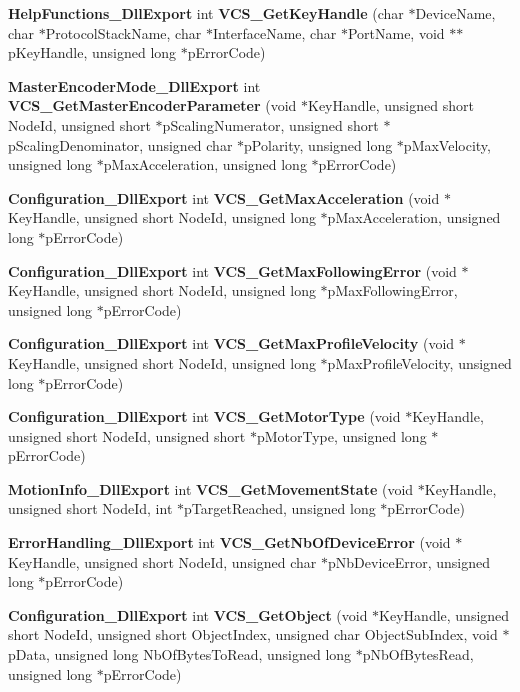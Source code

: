 \begin{DoxyCompactItemize}
\item 
{\bf \-Help\-Functions\-\_\-\-Dll\-Export} int {\bf \-V\-C\-S\-\_\-\-Get\-Key\-Handle} (char $\ast$\-Device\-Name, char $\ast$\-Protocol\-Stack\-Name, char $\ast$\-Interface\-Name, char $\ast$\-Port\-Name, void $\ast$$\ast$p\-Key\-Handle, unsigned long $\ast$p\-Error\-Code)
\item 
{\bf \-Master\-Encoder\-Mode\-\_\-\-Dll\-Export} int {\bf \-V\-C\-S\-\_\-\-Get\-Master\-Encoder\-Parameter} (void $\ast$\-Key\-Handle, unsigned short \-Node\-Id, unsigned short $\ast$p\-Scaling\-Numerator, unsigned short $\ast$p\-Scaling\-Denominator, unsigned char $\ast$p\-Polarity, unsigned long $\ast$p\-Max\-Velocity, unsigned long $\ast$p\-Max\-Acceleration, unsigned long $\ast$p\-Error\-Code)
\item 
{\bf \-Configuration\-\_\-\-Dll\-Export} int {\bf \-V\-C\-S\-\_\-\-Get\-Max\-Acceleration} (void $\ast$\-Key\-Handle, unsigned short \-Node\-Id, unsigned long $\ast$p\-Max\-Acceleration, unsigned long $\ast$p\-Error\-Code)
\item 
{\bf \-Configuration\-\_\-\-Dll\-Export} int {\bf \-V\-C\-S\-\_\-\-Get\-Max\-Following\-Error} (void $\ast$\-Key\-Handle, unsigned short \-Node\-Id, unsigned long $\ast$p\-Max\-Following\-Error, unsigned long $\ast$p\-Error\-Code)
\item 
{\bf \-Configuration\-\_\-\-Dll\-Export} int {\bf \-V\-C\-S\-\_\-\-Get\-Max\-Profile\-Velocity} (void $\ast$\-Key\-Handle, unsigned short \-Node\-Id, unsigned long $\ast$p\-Max\-Profile\-Velocity, unsigned long $\ast$p\-Error\-Code)
\item 
{\bf \-Configuration\-\_\-\-Dll\-Export} int {\bf \-V\-C\-S\-\_\-\-Get\-Motor\-Type} (void $\ast$\-Key\-Handle, unsigned short \-Node\-Id, unsigned short $\ast$p\-Motor\-Type, unsigned long $\ast$p\-Error\-Code)
\item 
{\bf \-Motion\-Info\-\_\-\-Dll\-Export} int {\bf \-V\-C\-S\-\_\-\-Get\-Movement\-State} (void $\ast$\-Key\-Handle, unsigned short \-Node\-Id, int $\ast$p\-Target\-Reached, unsigned long $\ast$p\-Error\-Code)
\item 
{\bf \-Error\-Handling\-\_\-\-Dll\-Export} int {\bf \-V\-C\-S\-\_\-\-Get\-Nb\-Of\-Device\-Error} (void $\ast$\-Key\-Handle, unsigned short \-Node\-Id, unsigned char $\ast$p\-Nb\-Device\-Error, unsigned long $\ast$p\-Error\-Code)
\item 
{\bf \-Configuration\-\_\-\-Dll\-Export} int {\bf \-V\-C\-S\-\_\-\-Get\-Object} (void $\ast$\-Key\-Handle, unsigned short \-Node\-Id, unsigned short \-Object\-Index, unsigned char \-Object\-Sub\-Index, void $\ast$p\-Data, unsigned long \-Nb\-Of\-Bytes\-To\-Read, unsigned long $\ast$p\-Nb\-Of\-Bytes\-Read, unsigned long $\ast$p\-Error\-Code)
$$
\end{DoxyCompactItemize}
